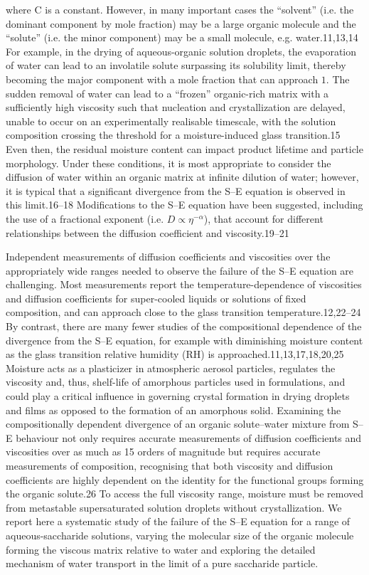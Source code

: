 where C is a constant. However, in many important cases the ``solvent” (i.e. the dominant component by mole fraction) may be a large organic molecule and the ``solute” (i.e. the minor component) may be a small molecule, e.g. water.11,13,14 For example, in the drying of aqueous-organic solution droplets, the evaporation of water can lead to an involatile solute surpassing its solubility limit, thereby becoming the major component with a mole fraction that can approach $1$. The sudden removal of water can lead to a “frozen” organic-rich matrix with a sufficiently high viscosity such that nucleation and crystallization are delayed, unable to occur on an experimentally realisable timescale, with the solution composition crossing the threshold for a moisture-induced glass transition.15 Even then, the residual moisture content can impact product lifetime and particle morphology. Under these conditions, it is most appropriate to consider the diffusion of water within an organic matrix at infinite dilution of water; however, it is typical that a significant divergence from the S–E equation is observed in this limit.16–18 Modifications to the S–E equation have been suggested, including the use of a fractional exponent (i.e. $D \propto \eta^{-\alpha}$), that account for different relationships between the diffusion coefficient and viscosity.19–21

Independent measurements of diffusion coefficients and viscosities over the appropriately wide ranges needed to observe the failure of the S–E equation are challenging. Most measurements report the temperature-dependence of viscosities and diffusion coefficients for super-cooled liquids or solutions of fixed composition, and can approach close to the glass transition temperature.12,22–24 By contrast, there are many fewer studies of the compositional dependence of the divergence from the S–E equation, for example with diminishing moisture content as the glass transition relative humidity (RH) is approached.11,13,17,18,20,25 Moisture acts as a plasticizer in atmospheric aerosol particles, regulates the viscosity and, thus, shelf-life of amorphous particles used in formulations, and could play a critical influence in governing crystal formation in drying droplets and films as opposed to the formation of an amorphous solid. Examining the compositionally dependent divergence of an organic solute–water mixture from S–E behaviour not only requires accurate measurements of diffusion coefficients and viscosities over as much as 15 orders of magnitude but requires accurate measurements of composition, recognising that both viscosity and diffusion coefficients are highly dependent on the identity for the functional groups forming the organic solute.26 To access the full viscosity range, moisture must be removed from metastable supersaturated solution droplets without crystallization. We report here a systematic study of the failure of the S–E equation for a range of aqueous-saccharide solutions, varying the molecular size of the organic molecule forming the viscous matrix relative to water and exploring the detailed mechanism of water transport in the limit of a pure saccharide particle.

